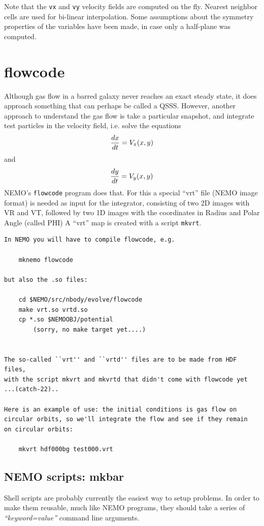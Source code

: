 \documentclass[10pt,dvips]{article}
\begin{document}
{Note that the {\tt vx} and {\tt vy} velocity fields
are computed on the fly. Nearest neighbor cells are
used for bi-linear interpolation. Some assumptions
about the symmetry properties of the variables
have been made, in case only a half-plane was
computed.



\section{flowcode}

Although gas flow in a barred galaxy never reaches an
exact steady state, it does approach something
that can perhaps be called a QSSS. However, another approach
to understand the gas flow is take a particular snapshot, and
integrate test particles in the velocity field, i.e.
solve the equations
$$
	{dx \over dt } = V_x(x,y)
$$
and
$$
	{dy \over dt } = V_y(x,y)
$$
NEMO's {\tt flowcode} program does that. For this a special
``vrt'' file (NEMO image format) is needed as input for the
integrator, consisting
of two 2D images with VR and VT, followed by two 1D images
with the coordinates in Radius and Polar Angle (called PHI)
A ``vrt'' map is created with a script {\tt mkvrt}.

\begin{verbatim}
In NEMO you will have to compile flowcode, e.g.

	mknemo flowcode

but also the .so files:

	cd $NEMO/src/nbody/evolve/flowcode
	make vrt.so vrtd.so
	cp *.so $NEMOOBJ/potential
		(sorry, no make target yet....)
	

The so-called ``vrt'' and ``vrtd'' files are to be made from HDF files,
with the script mkvrt and mkvrtd that didn't come with flowcode yet
...(catch-22)..

Here is an example of use: the initial conditions is gas flow on
circular orbits, so we'll integrate the flow and see if they remain
on circular orbits:

	mkvrt hdf000bg test000.vrt

\end{verbatim}

\subsection{NEMO scripts: mkbar}

Shell scripts are probably currently the easiest way to setup
problems. In order to make them reusable, much like NEMO
programs, they should take a series of {\it ``keyword=value''}
command line arguments.

}
\end{document}
